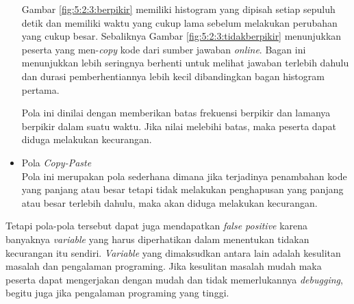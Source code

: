 \begin{itemize}
    Gambar \ref{fig:5:2:3:berpikir} memiliki histogram yang dipisah setiap sepuluh detik dan memiliki waktu yang cukup lama sebelum melakukan perubahan yang cukup besar. Sebaliknya Gambar \ref{fig:5:2:3:tidakberpikir} menunjukkan peserta yang men-\textit{copy} kode dari sumber jawaban \textit{online}. Bagan ini menunjukkan lebih seringnya berhenti untuk melihat jawaban terlebih dahulu dan durasi pemberhentiannya lebih kecil dibandingkan bagan histogram pertama.

    Pola ini dinilai dengan memberikan batas frekuensi berpikir dan lamanya berpikir dalam suatu waktu. Jika nilai melebihi batas, maka peserta dapat diduga melakukan kecurangan.

    \newpage
    
    \item Pola \textit{Copy-Paste} \\
    Pola ini merupakan pola sederhana dimana jika terjadinya penambahan kode yang panjang atau besar tetapi tidak melakukan penghapusan yang panjang atau besar terlebih dahulu, maka akan diduga melakukan kecurangan.

\end{itemize}

Tetapi pola-pola tersebut dapat juga mendapatkan \textit{false positive} karena banyaknya \textit{variable} yang harus diperhatikan dalam menentukan tidakan kecurangan itu sendiri. \textit{Variable} yang dimaksudkan antara lain adalah kesulitan masalah dan pengalaman programing. Jika kesulitan masalah mudah maka peserta dapat mengerjakan dengan mudah dan tidak memerlukannya \textit{debugging}, begitu juga jika pengalaman programing yang tinggi.